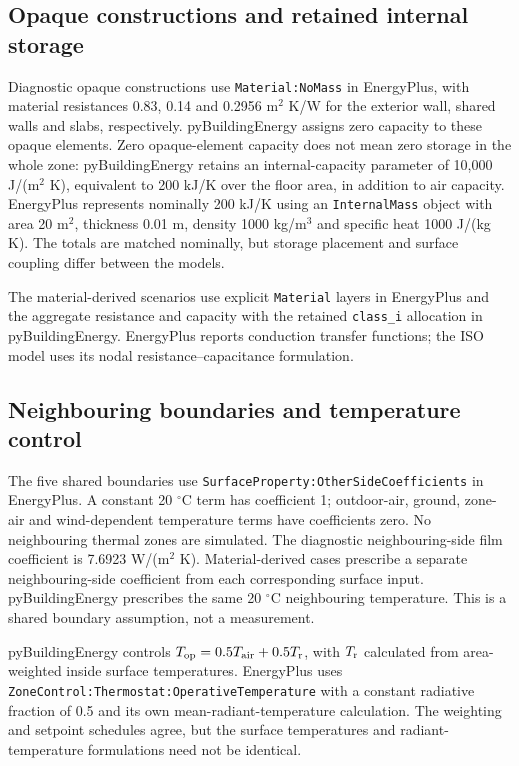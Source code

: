 \subsection{Opaque constructions and retained internal storage}
Diagnostic opaque constructions use \nolinkurl{Material:NoMass} in EnergyPlus, with material resistances 0.83, 0.14 and 0.2956 m$^2$ K/W for the exterior wall, shared walls and slabs, respectively. pyBuildingEnergy assigns zero capacity to these opaque elements. Zero opaque-element capacity does not mean zero storage in the whole zone: pyBuildingEnergy retains an internal-capacity parameter of 10,000 J/(m$^2$ K), equivalent to 200 kJ/K over the floor area, in addition to air capacity. EnergyPlus represents nominally 200 kJ/K using an \nolinkurl{InternalMass} object with area 20 m$^2$, thickness 0.01 m, density 1000 kg/m$^3$ and specific heat 1000 J/(kg K). The totals are matched nominally, but storage placement and surface coupling differ between the models.

The material-derived scenarios use explicit \nolinkurl{Material} layers in EnergyPlus and the aggregate resistance and capacity with the retained \nolinkurl{class_i} allocation in pyBuildingEnergy. EnergyPlus reports conduction transfer functions; the ISO model uses its nodal resistance--capacitance formulation.

\subsection{Neighbouring boundaries and temperature control}
The five shared boundaries use \nolinkurl{SurfaceProperty:OtherSideCoefficients} in EnergyPlus. A constant 20 $^\circ$C term has coefficient 1; outdoor-air, ground, zone-air and wind-dependent temperature terms have coefficients zero. No neighbouring thermal zones are simulated. The diagnostic neighbouring-side film coefficient is 7.6923 W/(m$^2$ K). Material-derived cases prescribe a separate neighbouring-side coefficient from each corresponding surface input. pyBuildingEnergy prescribes the same 20 $^\circ$C neighbouring temperature. This is a shared boundary assumption, not a measurement.

pyBuildingEnergy controls $T_{\rm op}=0.5T_{\rm air}+0.5T_{\rm r}$, with $T_{\rm r}$ calculated from area-weighted inside surface temperatures. EnergyPlus uses \nolinkurl{ZoneControl:Thermostat:OperativeTemperature} with a constant radiative fraction of 0.5 and its own mean-radiant-temperature calculation. The weighting and setpoint schedules agree, but the surface temperatures and radiant-temperature formulations need not be identical.

